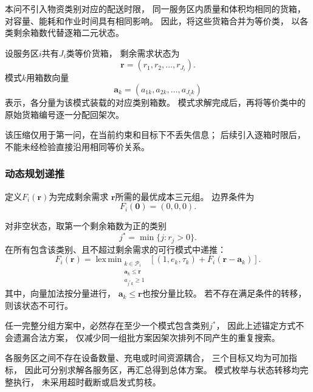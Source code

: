 \documentclass[bwprint]{gmcmthesis}
\begin{document}
本问不引入物资类别对应的配送时限，
同一服务区内质量和体积均相同的货箱，
对容量、能耗和作业时间具有相同影响。
因此，将这些货箱合并为等价类，
以各类剩余箱数代替逐箱二元状态。

设服务区$i$共有$J_i$类等价货箱，
剩余需求状态为
\begin{equation}
    \boldsymbol{r}
    =
    (r_1,r_2,\ldots,r_{J_i}).
\end{equation}
模式$k$用箱数向量
\begin{equation}
    \boldsymbol{a}_k
    =
    (a_{1k},a_{2k},\ldots,a_{J_i k})
\end{equation}
表示，各分量为该模式装载的对应类别箱数。
模式求解完成后，再将等价类中的原始货箱编号逐一分配回架次。

该压缩仅用于第一问，在当前约束和目标下不丢失信息；
后续引入逐箱时限后，不能未经检验直接沿用相同等价关系。

\subsubsection{动态规划递推}

定义$F_i(\boldsymbol{r})$为完成剩余需求
$\boldsymbol{r}$所需的最优成本三元组。
边界条件为
\begin{equation}
    F_i(\boldsymbol{0})=(0,0,0).
\end{equation}

对非空状态，取第一个剩余箱数为正的类别
\begin{equation}
    j^{*}
    =
    \min\{j:r_j>0\}.
\end{equation}
在所有包含该类别、且不超过剩余需求的可行模式中递推：
\begin{equation}
    F_i(\boldsymbol{r})
    =
    \operatorname{lex\,min}_{\substack{
        k\in\mathcal{P}_i\\
        \boldsymbol{a}_k\leq\boldsymbol{r}\\
        a_{j^{*}k}\geq1
    }}
    \left[
        (1,e_k,\tau_k)
        +
        F_i(\boldsymbol{r}-\boldsymbol{a}_k)
    \right].
\label{eq:q1_dp}
\end{equation}
其中，向量加法按分量进行，
$\boldsymbol{a}_k\leq\boldsymbol{r}$也按分量比较。
若不存在满足条件的转移，则该状态不可行。

任一完整分组方案中，必然存在至少一个模式包含类别$j^{*}$，
因此上述锚定方式不会遗漏合法方案，
仅减少同一组批方案因架次排列不同产生的重复搜索。

各服务区之间不存在设备数量、充电或时间资源耦合，
三个目标又均为可加指标，
因此可分别求解各服务区，再汇总得到总体方案。
模式枚举与状态转移均完整执行，
未采用超时截断或启发式剪枝。
\end{document}

